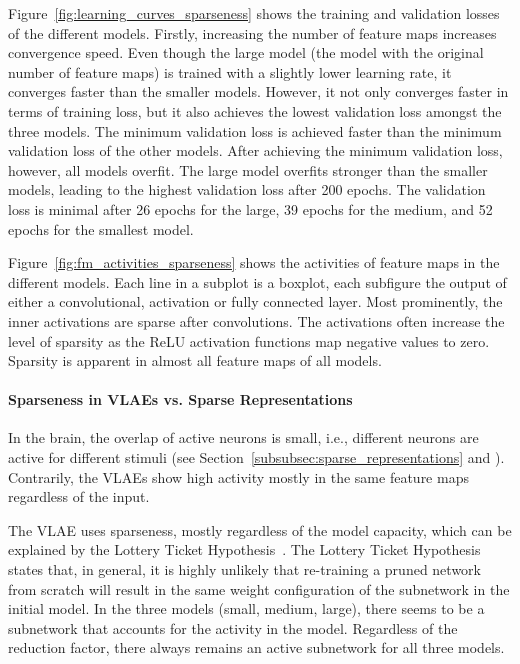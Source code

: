 Figure~\ref{fig:learning_curves_sparseness} shows the training and validation losses of the different models.
Firstly, increasing the number of feature maps increases convergence speed.
Even though the large model (the model with the original number of feature maps) is trained with a slightly lower learning rate, it converges faster than the smaller models.
However, it not only converges faster in terms of training loss, but it also achieves the lowest validation loss amongst the three models.
The minimum validation loss is achieved faster than the minimum validation loss of the other models.
After achieving the minimum validation loss, however, all models overfit.
The large model overfits stronger than the smaller models, leading to the highest validation loss after 200 epochs.
The validation loss is minimal after 26 epochs for the large, 39 epochs for the medium, and 52 epochs for the smallest model.

Figure~\ref{fig:fm_activities_sparseness} shows the activities of feature maps in the different models.
Each line in a subplot is a boxplot, each subfigure the output of either a convolutional, activation or fully connected layer.
Most prominently, the inner activations are sparse after convolutions.
The activations often increase the level of sparsity as the ReLU activation functions map negative values to zero.
Sparsity is apparent in almost all feature maps of all models.

\paragraph{Sparseness in \acp{VLAE} vs. Sparse Representations}
In the brain, the overlap of active neurons is small, i.e., different neurons are active for different stimuli (see Section~\ref{subsubsec:sparse_representations} and \citet{yoshida2020natural}).
Contrarily, the \acp{VLAE} show high activity mostly in the same feature maps regardless of the input.

The \ac{VLAE} uses sparseness, mostly regardless of the model capacity, which can be explained by the Lottery Ticket Hypothesis~\citep{frankle2018lottery}.
The Lottery Ticket Hypothesis states that, in general, it is highly unlikely that re-training a pruned network from scratch will result in the same weight configuration of the subnetwork in the initial model.
In the three models (small, medium, large), there seems to be a subnetwork that accounts for the activity in the model.
Regardless of the reduction factor, there always remains an active subnetwork for all three models.

